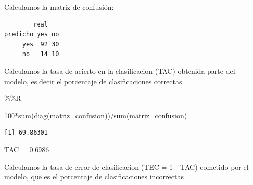 \documentclass[
  11pt,
  a4paper,
]{article}
\newenvironment{Shaded}{\begin{snugshade}}{\end{snugshade}}
\newcommand{\AttributeTok}[1]{\textcolor[rgb]{0.77,0.63,0.00}{#1}}
\newcommand{\DecValTok}[1]{\textcolor[rgb]{0.00,0.00,0.81}{#1}}
\newcommand{\FunctionTok}[1]{\textcolor[rgb]{0.00,0.00,0.00}{#1}}
\newcommand{\NormalTok}[1]{#1}
\newcommand{\OtherTok}[1]{\textcolor[rgb]{0.56,0.35,0.01}{#1}}
\newcommand{\SpecialCharTok}[1]{\textcolor[rgb]{0.00,0.00,0.00}{#1}}
\newcommand{\StringTok}[1]{\textcolor[rgb]{0.31,0.60,0.02}{#1}}
\begin{document}
\vspace{0.2cm}

Calculamos la matriz de confusión:

\begin{Shaded}
\end{Shaded}

\begin{verbatim}
        real
predicho yes no
     yes  92 30
     no   14 10
\end{verbatim}

\vspace{0.2cm}

Calculamos la tasa de acierto en la clasificacion (TAC) obtenida parte
del modelo, es decir el porcentaje de clasificaciones correctas.

\begin{Shaded}
\begin{Highlighting}[]
\SpecialCharTok{\%\%}\NormalTok{R}

\DecValTok{100}\SpecialCharTok{*}\FunctionTok{sum}\NormalTok{(}\FunctionTok{diag}\NormalTok{(matriz\_confusion))}\SpecialCharTok{/}\FunctionTok{sum}\NormalTok{(matriz\_confusion)}
\end{Highlighting}
\end{Shaded}

\begin{verbatim}
[1] 69.86301
\end{verbatim}

TAC = 0.6986

\vspace{0.2cm}

Calculamos la tasa de error de clasificacion (TEC = 1 - TAC) cometido
por el modelo, que es el porcentaje de clasificaciones incorrectas

\begin{Shaded}
\end{Shaded}
\end{document}
